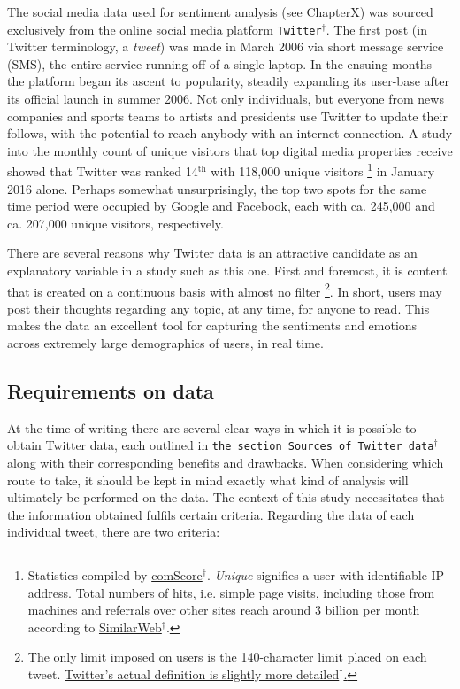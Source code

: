 \documentclass{article}
\begin{document}
The social media data used for sentiment analysis (see ChapterX) was sourced exclusively from the online social media platform \texttt{Twitter$^{\dag{}}$}. The first post (in Twitter terminology, a \emph{tweet}) was made in March 2006 via short message service (SMS), the entire service running off of a single laptop. In the ensuing months the platform began its ascent to popularity, steadily expanding its user-base after its official launch in summer 2006. Not only individuals, but everyone from news companies and sports teams to artists and presidents use Twitter to update their follows, with the potential to reach anybody with an internet connection.
A study into the monthly count of unique visitors that top digital media properties receive showed that Twitter was ranked 14$^{\text{th}}$ with 118,000 unique visitors \footnote{Statistics compiled by \href{http://www.comscore.com/Insights/Rankings/comScore-Ranks-the-Top-50-US-Digital-Media-Properties-for-January-2016}{comScore$^{\dag{}}$}. \emph{Unique} signifies a user with identifiable IP address. Total numbers of hits, i.e. simple page visits, including those from machines and referrals over other sites reach around 3 billion per month according to \href{https://www.similarweb.com/website/twitter.com\#overview}{SimilarWeb$^{\dag{}}$}.} in January 2016 alone. Perhaps somewhat unsurprisingly, the top two spots for the same time period were occupied by Google and Facebook, each with ca. 245,000 and ca. 207,000 unique visitors, respectively.

There are several reasons why Twitter data is an attractive candidate as an explanatory variable in a study such as this one. First and foremost, it is content that is created on a continuous basis with almost no filter \footnote{The only limit imposed on users is the 140-character limit placed on each tweet. \href{https://dev.twitter.com/overview/api/counting-characters}{Twitter's actual definition is slightly more detailed$^{\dag{}}$.}}. In short, users may post their thoughts regarding any topic, at any time, for anyone to read. This makes the data an excellent tool for capturing the sentiments and emotions across extremely large demographics of users, in real time.


\subsection{Requirements on data \label{criteria}}
\label{sec-2-2}

At the time of writing there are several clear ways in which it is possible to obtain Twitter data, each outlined in \texttt{the section Sources of Twitter data$^{\dag{}}$} along with their corresponding benefits and drawbacks. When considering which route to take, it should be kept in mind exactly what kind of analysis will ultimately be performed on the data. The context of this study necessitates that the information obtained fulfils certain criteria. Regarding the data of each individual tweet, there are two criteria:
\end{document}
